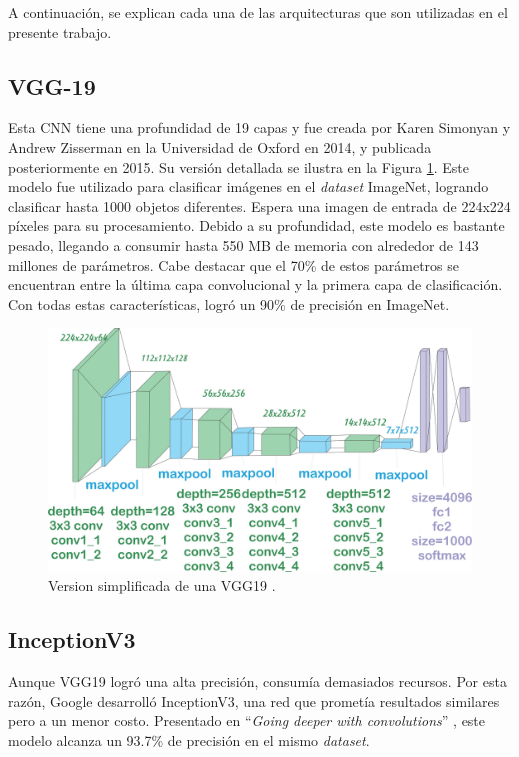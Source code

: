 A continuación, se explican cada una de las arquitecturas que 
son utilizadas en el presente trabajo. 

\subsection{VGG-19} 

Esta CNN tiene una profundidad de 19 capas y fue
creada por Karen Simonyan y Andrew Zisserman \cite{Simonyan2015}
en la Universidad de Oxford en 2014, y publicada posteriormente
en 2015. Su versión detallada se ilustra en la Figura \ref{VGG19}.
Este modelo fue utilizado para clasificar imágenes en el
\textit{dataset} ImageNet, logrando clasificar hasta 1000 objetos
diferentes. Espera una imagen de entrada de 224x224 píxeles para
su procesamiento. Debido a su profundidad, este modelo es bastante
pesado, llegando a consumir hasta 550 MB de memoria con alrededor
de 143 millones de parámetros. Cabe destacar que el 70\% de estos
parámetros se encuentran entre la última capa convolucional y la
primera capa de clasificación. Con todas estas características,
logró un 90\% de precisión en ImageNet.


\begin{figure}[h!] 
    \includegraphics[width=1\textwidth]{images/VGG19.jpeg} 
    \centering 
    \caption{Version simplificada de una VGG19 \protect\cite{modelos}.} 
    \label{VGG19} 
\end{figure}


\subsection{InceptionV3} \label{sec:inceptionV3}
Aunque VGG19 logró una alta precisión, consumía demasiados
recursos. Por esta razón, Google desarrolló InceptionV3, una
red que prometía resultados similares pero a un menor costo.
Presentado en ``\textit{Going deeper with convolutions}''
\cite{Szegedy2014}, este modelo alcanza un 93.7\% de precisión
en el mismo \textit{dataset}.\

